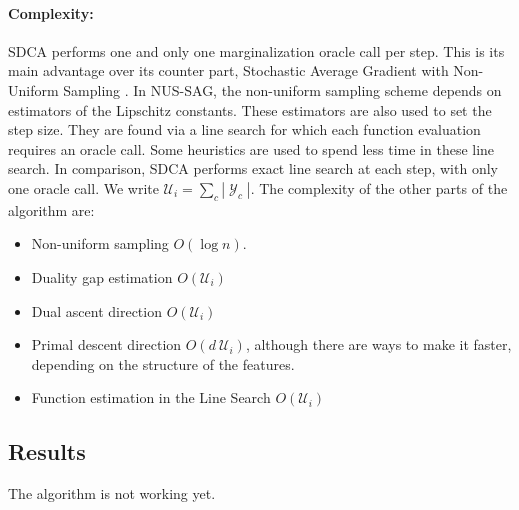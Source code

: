 \documentclass{article}
\DeclareMathOperator{\1}{\mathbb{1}}
\DeclareMathOperator{\Y}{\mathcal{Y}}
\begin{document}
\paragraph{Complexity:}
SDCA performs one and only one marginalization oracle call per step.
This is its main advantage over its counter part, Stochastic Average Gradient with Non-Uniform Sampling \cite{schmidt_non-uniform_2015}.
In NUS-SAG, the non-uniform sampling scheme depends on estimators of the Lipschitz constants.
These estimators are also used to set the step size.
They are found via a line search for which each function evaluation requires an oracle call.
Some heuristics are used to spend less time in these line search.
In comparison, SDCA performs exact line search at each step, with only one oracle call.
We write $\mathcal U_i = \sum_c |\Y_c|$. The complexity of the other parts of the algorithm are:
\begin{itemize}
	\item Non-uniform sampling $O(\log n)$.
	\item Duality gap estimation $O(\mathcal U_i)$
	\item Dual ascent direction $O(\mathcal U_i)$
	\item Primal descent direction $O(d \ \mathcal U_i)$, although there are ways to make it faster, depending on the structure of the features.
	\item Function estimation in the Line Search $O(\mathcal U_i)$
\end{itemize}

\subsection{Results}

The algorithm is not working yet.




\end{document}
